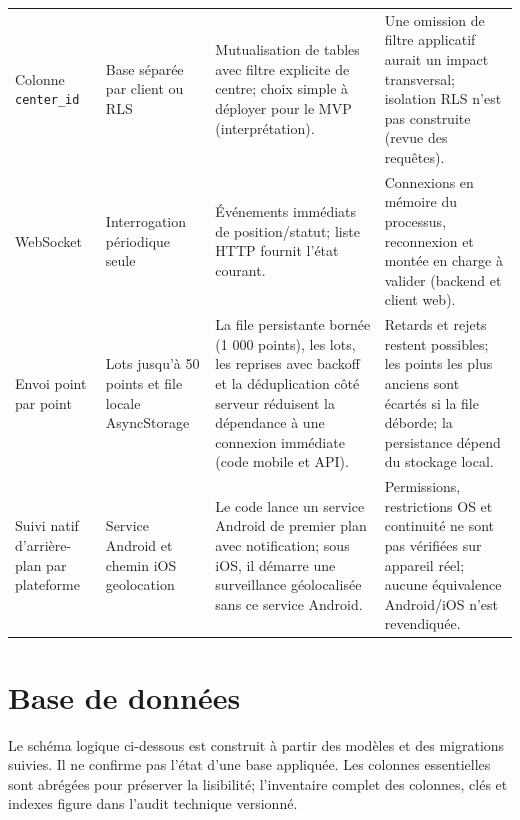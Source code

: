 \documentclass[12pt,a4paper]{article}
\begin{document}
\begin{longtable}{p{2.6cm}p{3.0cm}p{4.2cm}p{4.1cm}}
Colonne \texttt{center\_id} & Base séparée par client ou RLS & Mutualisation de tables avec filtre explicite de centre; choix simple à déployer pour le MVP (interprétation). & Une omission de filtre applicatif aurait un impact transversal; isolation RLS n'est pas construite (revue des requêtes).\\
WebSocket & Interrogation périodique seule & Événements immédiats de position/statut; liste HTTP fournit l'état courant. & Connexions en mémoire du processus, reconnexion et montée en charge à valider (backend et client web).\\
Envoi point par point & Lots jusqu'à 50 points et file locale AsyncStorage & La file persistante bornée (1 000 points), les lots, les reprises avec backoff et la déduplication côté serveur réduisent la dépendance à une connexion immédiate (code mobile et API). & Retards et rejets restent possibles; les points les plus anciens sont écartés si la file déborde; la persistance dépend du stockage local.\\
Suivi natif d'arrière-plan par plateforme & Service Android et chemin iOS geolocation & Le code lance un service Android de premier plan avec notification; sous iOS, il démarre une surveillance géolocalisée sans ce service Android. & Permissions, restrictions OS et continuité ne sont pas vérifiées sur appareil réel; aucune équivalence Android/iOS n'est revendiquée.\\
\bottomrule
\end{longtable}
\normalsize

\section{Base de données}

Le schéma logique ci-dessous est construit à partir des modèles et des migrations suivies. Il ne confirme pas l'état d'une base appliquée. Les colonnes essentielles sont abrégées pour préserver la lisibilité; l'inventaire complet des colonnes, clés et indexes figure dans l'audit technique versionné.
\end{document}
